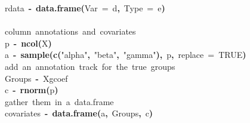 \documentclass[a4paper]{article}\usepackage{graphicx, color}
\makeatletter
\newcommand{\hlnumber}[1]{\textcolor[rgb]{0,0,0}{#1}}%
\newcommand{\hlfunctioncall}[1]{\textcolor[rgb]{0.501960784313725,0,0.329411764705882}{\textbf{#1}}}%
\newcommand{\hlstring}[1]{\textcolor[rgb]{0.6,0.6,1}{#1}}%
\newcommand{\hlkeyword}[1]{\textcolor[rgb]{0,0,0}{\textbf{#1}}}%
\newcommand{\hlargument}[1]{\textcolor[rgb]{0.690196078431373,0.250980392156863,0.0196078431372549}{#1}}%
\newcommand{\hlcomment}[1]{\textcolor[rgb]{0.180392156862745,0.6,0.341176470588235}{#1}}%
\newcommand{\hlassignement}[1]{\textcolor[rgb]{0,0,0}{\textbf{#1}}}%
\newcommand{\hlsymbol}[1]{\textcolor[rgb]{0,0,0}{#1}}%
\newcommand{\hlstd}[1]{\textcolor[rgb]{0,0,0}{#1}}%
\newenvironment{kframe}{%
 \def\FrameCommand##1{\hskip\@totalleftmargin \hskip-\fboxsep
 \colorbox{shadecolor}{##1}\hskip-\fboxsep
     \hskip-\linewidth \hskip-\@totalleftmargin \hskip\columnwidth}%
 \MakeFramed {\advance\hsize-\width
   \@totalleftmargin\z@ \linewidth\hsize
   \@setminipage}}%
 {\par\unskip\endMakeFramed}
\newenvironment{knitrout}{}{} %
\makeatother
\begin{document}
\begin{knitrout}
\begin{kframe}
\begin{flushleft}
\hlstd{}\hlsymbol{rdata}{\ }\hlassignement{\usebox{\hlnormalsizeboxlessthan}-}{\ }\hlfunctioncall{data.frame}\hlkeyword{(}\hlargument{Var}{\ }\hlargument{=}{\ }\hlsymbol{d}\hlkeyword{,}{\ }\hlargument{Type}{\ }\hlargument{=}{\ }\hlsymbol{e}\hlkeyword{)}\hspace*{\fill}\\
\hlstd{}\hspace*{\fill}\\
\hlstd{}\hlcomment{\usebox{\hlnormalsizeboxhash}{\ }column{\ }annotations{\ }and{\ }covariates}\hspace*{\fill}\\
\hlstd{}\hlsymbol{p}{\ }\hlassignement{\usebox{\hlnormalsizeboxlessthan}-}{\ }\hlfunctioncall{ncol}\hlkeyword{(}\hlsymbol{X}\hlkeyword{)}\hspace*{\fill}\\
\hlstd{}\hlsymbol{a}{\ }\hlassignement{\usebox{\hlnormalsizeboxlessthan}-}{\ }\hlfunctioncall{sample}\hlkeyword{(}\hlfunctioncall{c}\hlkeyword{(}\hlstring{"{}alpha"{}}\hlkeyword{,}{\ }\hlstring{"{}beta"{}}\hlkeyword{,}{\ }\hlstring{"{}gamma"{}}\hlkeyword{)}\hlkeyword{,}{\ }\hlsymbol{p}\hlkeyword{,}{\ }\hlargument{replace}{\ }\hlargument{=}{\ }\hlnumber{TRUE}\hlkeyword{)}\hspace*{\fill}\\
\hlstd{}\hlcomment{\usebox{\hlnormalsizeboxhash}{\ }add{\ }an{\ }annotation{\ }track{\ }for{\ }the{\ }true{\ }groups}\hspace*{\fill}\\
\hlstd{}\hlsymbol{Groups}{\ }\hlassignement{\usebox{\hlnormalsizeboxlessthan}-}{\ }\hlsymbol{X}\hlkeyword{\usebox{\hlnormalsizeboxdollar}}\hlsymbol{gcoef}\hspace*{\fill}\\
\hlstd{}\hlsymbol{c}{\ }\hlassignement{\usebox{\hlnormalsizeboxlessthan}-}{\ }\hlfunctioncall{rnorm}\hlkeyword{(}\hlsymbol{p}\hlkeyword{)}\hspace*{\fill}\\
\hlstd{}\hlcomment{\usebox{\hlnormalsizeboxhash}{\ }gather{\ }them{\ }in{\ }a{\ }data.frame}\hspace*{\fill}\\
\hlstd{}\hlsymbol{covariates}{\ }\hlassignement{\usebox{\hlnormalsizeboxlessthan}-}{\ }\hlfunctioncall{data.frame}\hlkeyword{(}\hlsymbol{a}\hlkeyword{,}{\ }\hlsymbol{Groups}\hlkeyword{,}{\ }\hlsymbol{c}\hlkeyword{)}\mbox{}
\normalfont
\end{flushleft}
\end{kframe}
\end{knitrout}
\end{document}
